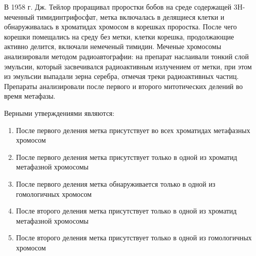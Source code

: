 
В 1958 г. Дж. Тейлор проращивал проростки бобов на среде содержащей 3H-меченный тимидинтрифосфат, метка включалась в делящиеся клетки и обнаруживалась в хроматидах хромосом в корешках проростка. После чего корешки помещались на среду без метки, клетки корешка, продолжающие активно делится, включали немеченый тимидин. Меченые хромосомы анализировали методом радиоавтографии: на препарат наслаивали тонкий слой эмульсии, который засвечивался радиоактивным излучением от метки, при этом из эмульсии выпадали зерна серебра, отмечая треки радиоактивных частиц. Препараты анализировали после первого и второго митотических делений во время метафазы.

Верными утверждениями являются:

\begin{enumerate}
    \item После первого деления метка присутствует во всех хроматидах метафазных хромосом
    \item После первого деления метка присутствует только в одной из хроматид метафазной хромосомы 
    \item После первого деления метка обнаруживается только в одной из гомологичных хромосом
    \item После второго деления метка присутствует только в одной из хроматид метафазной хромосомы
    \item После второго деления метка присутствует только в одной из гомологичных хромосом
\end{enumerate}

\explanationSection

